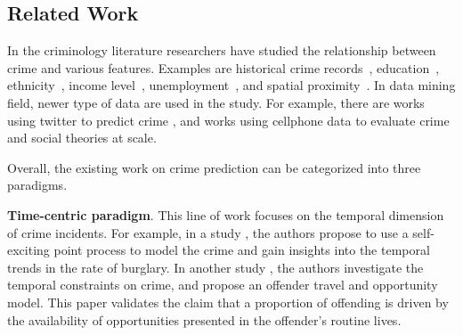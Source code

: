 \subsection{Related Work}


In the criminology literature researchers have studied the relationship between crime and various features. Examples are historical crime records~\cite{MSBS+12,WRWS13}, education~\cite{Ehrl75}, ethnicity~\cite{Brai89}, income level~\cite{Patt91}, unemployment~\cite{Free99}, and spatial proximity~\cite{Ans02}. 
In data mining field, newer type of data are used in the study. For example, there are works using twitter to predict crime \cite{WGB12,Gerb14}, and works using cellphone data \cite{TQC14,Bogo14} to evaluate crime and social theories at scale. 


Overall, the existing work on crime prediction can be categorized into three paradigms.



\textbf{Time-centric paradigm}. This line of work focuses on the temporal dimension of crime incidents. For example, in a study \cite{MSBS+12}, the authors propose to use a self-exciting point process to model the crime and gain insights into the temporal trends in the rate of burglary. In another study \cite{Ratc06}, the authors investigate the temporal constraints on crime, and propose an offender travel and opportunity model. This paper validates the claim that a proportion of offending is driven by the availability of opportunities presented in the offender's routine lives. 


